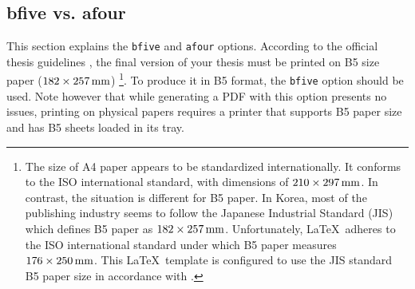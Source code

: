 \subsection{bfive vs. afour}	\label{sec:Guide_Documentclass_PaperOption}

This section explains the \verb|bfive| and \verb|afour| options.
According to the official thesis guidelines \cite{ThesisGuide}, the final version of your thesis must be printed on B5 size paper ($182 \times 257\,{\rm mm}$)%
\footnote{%
	The size of A4 paper appears to be standardized internationally.
	It conforms to the ISO international standard, with dimensions of $210 \times 297\,{\rm mm}$.
	In contrast, the situation is different for B5 paper.
	In Korea, most of the publishing industry seems to follow the Japanese Industrial Standard (JIS) which defines B5 paper as $182 \times 257\,{\rm mm}$.
	Unfortunately, \LaTeX~adheres to the ISO international standard under which B5 paper measures $176 \times 250\,{\rm mm}$.
	This \LaTeX~template is configured to use the JIS standard B5 paper size in accordance with \cite{ThesisGuide}.
}.
To produce it in B5 format, the \verb|bfive| option should be used.
Note however that while generating a PDF with this option presents no issues, printing on physical papers requires a printer that supports B5 paper size and has B5 sheets loaded in its tray.

